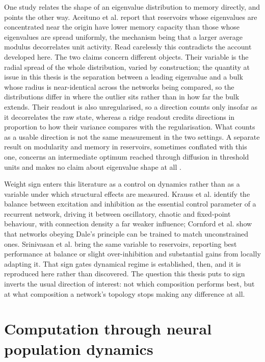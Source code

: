 One study relates the shape of an eigenvalue distribution to memory directly, and points
the other way. Aceituno et al. \cite{aceituno2020tailoring} report that reservoirs whose
eigenvalues are concentrated near the origin have lower memory capacity than those whose
eigenvalues are spread uniformly, the mechanism being that a larger average modulus
decorrelates unit activity. Read carelessly this contradicts the account developed here.
The two claims concern different objects. Their variable is the radial spread of the whole
distribution, varied by construction; the quantity at issue in this thesis is the
separation between a leading eigenvalue and a bulk whose radius is near-identical across
the networks being compared, so the distributions differ in where the outlier sits rather
than in how far the bulk extends. Their readout is also unregularised, so a direction
counts only insofar as it decorrelates the raw state, whereas a ridge readout credits
directions in proportion to how their variance compares with the regularisation. What
counts as a usable direction is not the same measurement in the two settings. A separate
result on modularity and memory in reservoirs, sometimes conflated with this one, concerns
an intermediate optimum reached through diffusion in threshold units and makes no claim
about eigenvalue shape at all \cite{rodriguez2019optimal}.
 
Weight sign enters this literature as a control on dynamics rather than as a variable under
which structural effects are measured. Krauss et al. \cite{krauss2019weight} identify the
balance between excitation and inhibition as the essential control parameter of a recurrent
network, driving it between oscillatory, chaotic and fixed-point behaviour, with connection
density a far weaker influence; Cornford et al. \cite{cornford2021learning} show that
networks obeying Dale's principle can be trained to match unconstrained ones. Srinivasan et
al. \cite{srinivasan2025boosting} bring the same variable to reservoirs, reporting best
performance at balance or slight over-inhibition and substantial gains from locally
adapting it. That sign gates dynamical regime is established, then, and it is reproduced
here rather than discovered. The question this thesis puts to sign inverts the usual
direction of interest: not which composition performs best, but at what composition a
network's topology stops making any difference at all.
 
 
 
 
\section{Computation through neural population dynamics}
\label{section:geometry}
\bigskip
 

